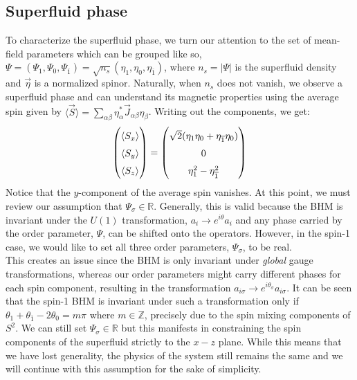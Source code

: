 \subsection{Superfluid phase}
To characterize the superfluid phase, we turn our attention to the set of mean-field parameters which can be grouped like so, $\Psi = (\Psi_1, \Psi_0, \Psi_{\overline{1}}) = \sqrt{n_s}(\eta_1, \eta_0, \eta_{\overline{1}})$, where $n_s = |\Psi|$ is the superfluid density and $\vec{\eta}$ is a normalized spinor. Naturally, when $n_s$ does not vanish, we observe a superfluid phase and can understand its magnetic properties using the average spin given by $\langle \vec{S} \rangle = \sum_{\alpha\beta}\eta_{\alpha}^* \vec{J}_{\alpha\beta}\eta_{\beta}$. Writing out the components, we get:
\begin{equation}
    \begingroup
\renewcommand*{\arraystretch}{1.5}
\begin{pmatrix}
    \langle S_x \rangle \\
    \langle S_y \rangle \\ 
    \langle S_z \rangle
\end{pmatrix}
\endgroup = 
\begingroup
\renewcommand*{\arraystretch}{1.5}
\begin{pmatrix}
    \sqrt{2}(\eta_1\eta_0 + \eta_{\overline{1}}\eta_0) \\ 
    0 \\
    \eta_1^2 - \eta_{\overline{1}}^2
\end{pmatrix}
\endgroup
\end{equation}
Notice that the $y$-component of the average spin vanishes. At this point, we must review our assumption that $\Psi_\sigma \in \mathbb{R}$. Generally, this is valid because the BHM is invariant under the $U(1)$ transformation, $a_i \to e^{i\theta}a_i$ and any phase carried by the order parameter, $\Psi$, can be shifted onto the operators. However, in the spin-1 case, we would like to set all three order parameters, $\Psi_{\sigma}$, to be real. 
\vspace{0.5cm}\\
This creates an issue since the BHM is only invariant under \textit{global} gauge transformations, whereas our order parameters might carry different phases for each spin component, resulting in the transformation $a_{i\sigma} \to e^{i\theta_{\sigma}} a_{i\sigma}$. It can be seen that the spin-1 BHM is invariant under such a transformation only if $\theta_1 + \theta_{\overline{1}} - 2\theta_0 = m\pi$ where $m \in \mathbb{Z}$, precisely due to the spin mixing components of $S^2$. We can still set $\Psi_{\sigma} \in \mathbb{R}$ but this manifests in constraining the spin components of the superfluid strictly to the $x-z$ plane. While this means that we have lost generality, the physics of the system still remains the same and we will continue with this assumption for the sake of simplicity.
